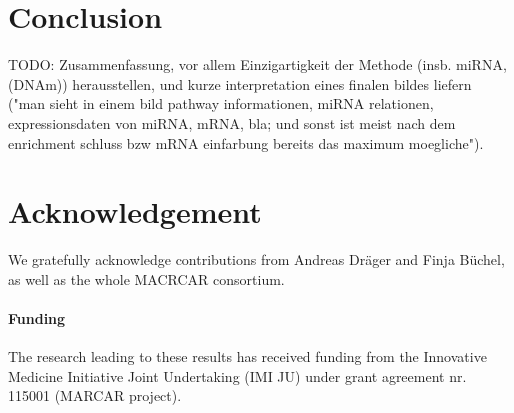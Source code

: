 \documentclass{bioinfo}
\begin{document}
\section{Conclusion}

TODO: Zusammenfassung, vor allem Einzigartigkeit der Methode (insb. miRNA, (DNAm)) herausstellen, und kurze interpretation eines finalen bildes liefern ("man sieht in einem bild pathway informationen, miRNA relationen, expressionsdaten von miRNA, mRNA, bla; und sonst ist meist nach dem enrichment schluss bzw mRNA einfarbung bereits das maximum moegliche").



\section*{Acknowledgement}
We gratefully acknowledge contributions from Andreas Dr\"ager and Finja B\"uchel, as well as the whole MACRCAR consortium.

\paragraph{Funding\textcolon} The research leading to these results has received funding from the Innovative Medicine Initiative Joint Undertaking (IMI JU) under grant agreement nr. 115001 (MARCAR project).


%
%
%
%
%


\end{document}
